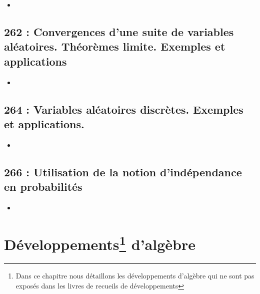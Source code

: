 \documentclass[a4paper,10pt,oneside,twocolumn,landscape]{book}
\begin{document}
\begin{itemize}
	\item 
\end{itemize}

\section{262 : Convergences d’une suite de variables aléatoires. Théorèmes limite. Exemples et applications}

\begin{itemize}
	\item 
\end{itemize}


\section{264 : Variables aléatoires discrètes. Exemples et applications.}

\begin{itemize}
	\item 
\end{itemize}


\section{266 : Utilisation de la notion d’indépendance en probabilités}

\begin{itemize}
\item 
\end{itemize}




\setcounter{secnumdepth}{1} %


\onecolumn	



\makeatletter
\renewcommand\@makefnmark{\raisebox{0.5ex}{\textsuperscript{\large\@thefnmark}}}
\chapter[Développements d'algèbre]{Développements\protect\footnote{Dans ce chapitre nous détaillons les développements d'algèbre qui ne sont pas exposés dans les livres de recueils de développements} d'algèbre}
\renewcommand\@makefnmark{\textsuperscript{\@thefnmark}}
\makeatother


\twocolumn



\end{document}

